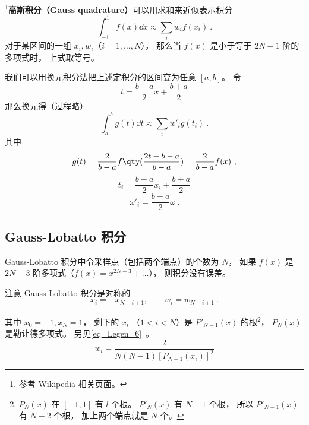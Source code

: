 
\begin{issues}
\issueAbstract
\end{issues}


\footnote{参考 Wikipedia \href{https://en.wikipedia.org/wiki/Gaussian_quadrature}{相关页面}。}\textbf{高斯积分（Gauss quadrature）}可以用求和来近似表示积分
\begin{equation}
\int_{-1}^1 f(x) \dd{x} \approx \sum_i w_i f(x_i)~.
\end{equation}
对于某区间的一组 $x_i, w_i$（$i = 1,\dots,N$）， 那么当 $f(x)$ 是小于等于 $2N-1$ 阶的多项式时， 上式取等号。

我们可以用换元积分法把上述定积分的区间变为任意 $[a,b]$。 令
\begin{equation}
t = \frac{b-a}{2}x + \frac{b+a}{2}
\end{equation}
那么换元得（过程略）
\begin{equation}
\int_a^b g(t) \dd{t} \approx \sum_i w'_i g(t_i)~.
\end{equation}
其中
\begin{equation}
g(t) = \frac{2}{b-a} f\qty(\frac{2t - b - a}{b - a}) = \frac{2}{b-a} f(x)~,
\end{equation}
\begin{equation}
t_i = \frac{b-a}{2}x_i + \frac{b+a}{2}
\end{equation}
\begin{equation}
\omega'_i = \frac{b-a}{2}\omega~.
\end{equation}


\subsection{Gauss-Lobatto 积分}
Gauss-Lobatto 积分中令采样点（包括两个端点）的个数为 $N$， 如果 $f(x)$ 是 $2N-3$ 阶多项式（$f(x) = x^{2N-3} + \dots$）， 则积分没有误差。

注意 Gauss-Lobatto 积分是对称的
\begin{equation}\label{eq_GLquad_5}
x_i = -x_{N-i+1}, \qquad w_{i} = w_{N-i+1}~.
\end{equation}

其中 $x_0 = -1, x_N = 1$， 剩下的 $x_i$ （$1 < i < N$）是 $P'_{N-1}(x)$ 的根\footnote{$P_N(x)$ 在 $[-1,1]$ 有 $l$ 个根。 $P'_N(x)$ 有 $N-1$ 个根， 所以 $P'_{N-1}(x)$ 有 $N-2$ 个根， 加上两个端点就是 $N$ 个。}， $P_N(x)$ 是勒让德多项式。 另见\autoref{eq_Legen_6}~。
\begin{equation} %
w_i = \frac{2}{N(N-1)[P_{N-1}(x_i)]^2}
\end{equation}

